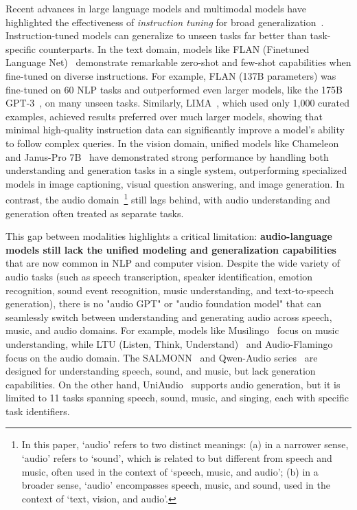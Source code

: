 Recent advances in large language models and multimodal models have highlighted the effectiveness of \emph{instruction tuning} for broad generalization~\citep{modelsfollow,touvron2023llama,achiam2023gpt}. Instruction-tuned models can generalize to unseen tasks far better than task-specific counterparts. In the text domain, models like FLAN (Finetuned Language Net)~\citep{wei2021flan} demonstrate remarkable zero-shot and few-shot capabilities when fine-tuned on diverse instructions. For example, FLAN (137B parameters) was fine-tuned on 60 NLP tasks and outperformed even larger models, like the 175B GPT-3~\citep{brown2020gpt3}, on many unseen tasks. Similarly, LIMA~\citep{zhou2024lima}, which used only 1,000 curated examples, achieved results preferred over much larger models, showing that minimal high-quality instruction data can significantly improve a model's ability to follow complex queries. In the vision domain, unified models like Chameleon~\citep{team2024chameleon} and Janus-Pro 7B~\citep{Janus} have demonstrated strong performance by handling both understanding and generation tasks in a single system, outperforming specialized models in image captioning, visual question answering, and image generation. In contrast, the audio domain~\footnote{In this paper, `audio' refers to two distinct meanings: (a) in a narrower sense, `audio' refers to `sound', which is related to but different from speech and music, often used in the context of `speech, music, and audio'; (b) in a broader sense, `audio' encompasses speech, music, and sound, used in the context of `text, vision, and audio'.} still lags behind, with audio understanding and generation often treated as separate tasks.

This gap between modalities highlights a critical limitation: \textbf{audio-language models still lack the unified modeling and generalization capabilities} that are now common in NLP and computer vision. Despite the wide variety of audio tasks (such as speech transcription, speaker identification, emotion recognition, sound event recognition, music understanding, and text-to-speech generation), there is no "audio GPT" or "audio foundation model" that can seamlessly switch between understanding and generating audio across speech, music, and audio domains. For example, models like Musilingo~\citep{deng2023musilingo} focus on music understanding, while LTU (Listen, Think, Understand)~\citep{gong2023listen} and Audio-Flamingo~\citep{kong2024audioflamingonovelaudio} focus on the audio domain. The SALMONN~\citep{tang2023salmonn} and Qwen-Audio series~\citep{chu2023qwen} are designed for understanding speech, sound, and music, but lack generation capabilities. On the other hand, UniAudio~\citep{yang2023uniaudio} supports audio generation, but it is limited to 11 tasks spanning speech, sound, music, and singing, each with specific task identifiers.

